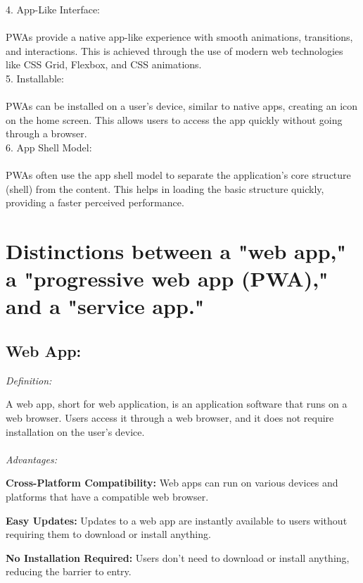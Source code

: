 \documentclass[journal]{IEEEtran}
\begin{document}
4. App-Like Interface:\\
   \\PWAs provide a native app-like experience with smooth animations, transitions, and interactions. This is achieved through the use of modern web technologies like CSS Grid, Flexbox, and CSS animations.\\

5. Installable:\\
   \\PWAs can be installed on a user's device, similar to native apps, creating an icon on the home screen. This allows users to access the app quickly without going through a browser.\\

6. App Shell Model:\\
   \\PWAs often use the app shell model to separate the application's core structure (shell) from the content. This helps in loading the basic structure quickly, providing a faster perceived performance.\\%

\section{Distinctions between a "web app," a "progressive web app (PWA)," and a "service app." }

\subsection{Web App:}

\textit{Definition:}

    A web app, short for web application, is an application software that runs on a web browser. Users access it through a web browser, and it does not require installation on the user's device.\\
\\\textit{Advantages:}

    \textbf{Cross-Platform Compatibility:} Web apps can run on various devices and platforms that have a compatible web browser.
    
    \textbf{Easy Updates:} Updates to a web app are instantly available to users without requiring them to download or install anything.
    
    \textbf{No Installation Required:} Users don't need to download or install anything, reducing the barrier to entry.
    
\end{document}
